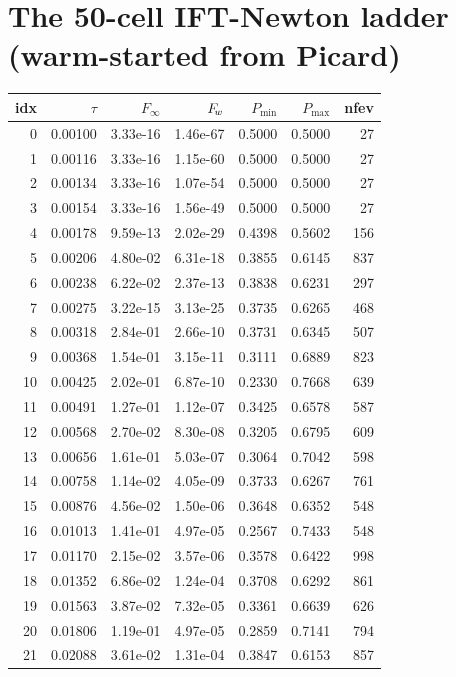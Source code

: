 \section{The 50-cell IFT-Newton ladder (warm-started from Picard)}
{\small\begin{longtable}{rrrrrrr}
\toprule
idx & $\tau$ & $F_\infty$ & $F_{\!w}$ & $P_{\min}$ & $P_{\max}$ & nfev \\
\midrule
\endhead
0 & 0.00100 & 3.33e-16 & 1.46e-67 & 0.5000 & 0.5000 & 27 \\
1 & 0.00116 & 3.33e-16 & 1.15e-60 & 0.5000 & 0.5000 & 27 \\
2 & 0.00134 & 3.33e-16 & 1.07e-54 & 0.5000 & 0.5000 & 27 \\
3 & 0.00154 & 3.33e-16 & 1.56e-49 & 0.5000 & 0.5000 & 27 \\
4 & 0.00178 & 9.59e-13 & 2.02e-29 & 0.4398 & 0.5602 & 156 \\
5 & 0.00206 & 4.80e-02 & 6.31e-18 & 0.3855 & 0.6145 & 837 \\
6 & 0.00238 & 6.22e-02 & 2.37e-13 & 0.3838 & 0.6231 & 297 \\
7 & 0.00275 & 3.22e-15 & 3.13e-25 & 0.3735 & 0.6265 & 468 \\
8 & 0.00318 & 2.84e-01 & 2.66e-10 & 0.3731 & 0.6345 & 507 \\
9 & 0.00368 & 1.54e-01 & 3.15e-11 & 0.3111 & 0.6889 & 823 \\
10 & 0.00425 & 2.02e-01 & 6.87e-10 & 0.2330 & 0.7668 & 639 \\
11 & 0.00491 & 1.27e-01 & 1.12e-07 & 0.3425 & 0.6578 & 587 \\
12 & 0.00568 & 2.70e-02 & 8.30e-08 & 0.3205 & 0.6795 & 609 \\
13 & 0.00656 & 1.61e-01 & 5.03e-07 & 0.3064 & 0.7042 & 598 \\
14 & 0.00758 & 1.14e-02 & 4.05e-09 & 0.3733 & 0.6267 & 761 \\
15 & 0.00876 & 4.56e-02 & 1.50e-06 & 0.3648 & 0.6352 & 548 \\
16 & 0.01013 & 1.41e-01 & 4.97e-05 & 0.2567 & 0.7433 & 548 \\
17 & 0.01170 & 2.15e-02 & 3.57e-06 & 0.3578 & 0.6422 & 998 \\
18 & 0.01352 & 6.86e-02 & 1.24e-04 & 0.3708 & 0.6292 & 861 \\
19 & 0.01563 & 3.87e-02 & 7.32e-05 & 0.3361 & 0.6639 & 626 \\
20 & 0.01806 & 1.19e-01 & 4.97e-05 & 0.2859 & 0.7141 & 794 \\
21 & 0.02088 & 3.61e-02 & 1.31e-04 & 0.3847 & 0.6153 & 857 \\

\end{longtable}}
